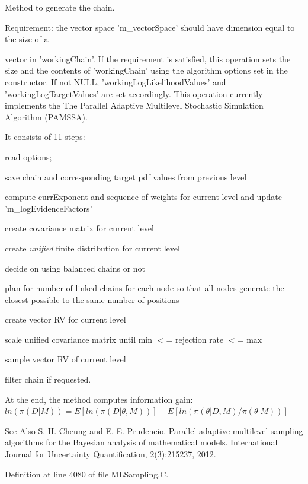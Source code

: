 Method to generate the chain. 

\begin{DoxyVerb}Requirement: the vector space 'm_vectorSpace' should have dimension equal to the size of a
\end{DoxyVerb}
 vector in 'working\-Chain'. If the requirement is satisfied, this operation sets the size and the contents of 'working\-Chain' using the algorithm options set in the constructor. If not N\-U\-L\-L, 'working\-Log\-Likelihood\-Values' and 'working\-Log\-Target\-Values' are set accordingly. This operation currently implements the The Parallel Adaptive Multilevel Stochastic Simulation Algorithm (P\-A\-M\-S\-S\-A).\par
 It consists of 11 steps\-: 
\begin{DoxyEnumerate}
\item read options; 
\item save chain and corresponding target pdf values from previous level 
\item compute curr\-Exponent and sequence of weights for current level and update 'm\-\_\-log\-Evidence\-Factors' 
\item create covariance matrix for current level 
\item create {\itshape unified} finite distribution for current level 
\item decide on using balanced chains or not 
\item plan for number of linked chains for each node so that all nodes generate the closest possible to the same number of positions 
\item create vector R\-V for current level 
\item scale unified covariance matrix until min $<$= rejection rate $<$= max 
\item sample vector R\-V of current level 
\item filter chain if requested. 
\end{DoxyEnumerate}At the end, the method computes information gain\-: $ ln( \pi(D|M) ) = E[ln( \pi(D|\theta,M) )] - E[ln( \pi(\theta|D,M) / \pi(\theta|M) )] $

\begin{DoxySeeAlso}{See Also}
S. H. Cheung and E. E. Prudencio. Parallel adaptive multilevel sampling algorithms for the Bayesian analysis of mathematical models. International Journal for Uncertainty Quantification, 2(3)\-:215237, 2012. 
\end{DoxySeeAlso}


Definition at line 4080 of file M\-L\-Sampling.\-C.



